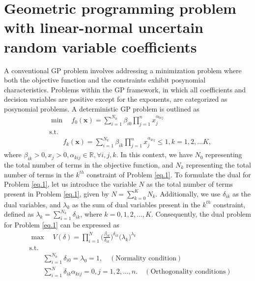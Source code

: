 \section{ Geometric programming problem with linear-normal uncertain random variable coefficients }\label{sec.4} 
	A conventional GP problem involves addressing a minimization problem where both the objective function and the constraints exhibit posynomial characteristics. Problems within the GP framework, in which all coefficients and decision variables are positive except for the exponents, are categorized as posynomial problems. A deterministic GP problem is outlined as
\begin{equation}\label{eq.1}
	\begin{aligned}
		&\min \quad f_0(\textbf{x})=\sum\limits_{i=1}^{N_0}\beta_{i0}\prod\limits_{j=1}^{n}x_j^{\alpha_{0ij}}\\
		&\text{s.t.}\\
		& \qquad f_k(\textbf{x})=\sum\limits_{i=1}^{N_k}\beta_{ik}\prod\limits_{j=1}^{n}x_j^{\alpha_{kij}}\leq 1,k=1,2,\ldots K,
	\end{aligned}
\end{equation}
where $\beta_{ik}>0, x_j>0, \alpha_{kij} \in \mathbb{R},\forall i,j,k$.
In this context, we have $N_0$ representing the total number of terms in the objective function, and $N_k$ representing the total number of terms in the $k^{th}$ constraint of Problem \ref{eq.1}. To formulate the dual for Problem \ref{eq.1}, let us introduce the variable $N$ as the total number of terms present in Problem \ref{eq.1}, given by $N=\sum\limits_{k=0}^{K}N_k$. Additionally, we use $\delta_{ik}$ as the dual variables, and $\lambda_k$ as the sum of dual variables present in the $k^{th}$ constraint, defined as $\lambda_k=\sum\limits_{i=1}^{N_k}{\delta_{ik}}$, where $k=0,1,2,\ldots,K$. Consequently, the dual problem for Problem \ref{eq.1} can be expressed as
\begin{equation}\label{eq.2}
	\begin{aligned}
		&	\max \quad V(\delta)=\prod_{i=1}^{N}\bigg(\frac{\beta_{ik}}{{\delta_{ik}}}\bigg)^{{\delta_{ik}}}\bigg(\lambda_k\bigg)^{\lambda_k}\\
		&	\text{s.t.}\\
		& \qquad \sum\limits_{i=1}^{N_0}{\delta_{i0}}=\lambda_0=1, \quad (\text{Normality condition})\\
		& \qquad\sum\limits_{i=1}^{N}{\delta_{ik}}{\alpha_{kij}}=0,j=1,2,\ldots,n. \quad (\text{Orthogonality conditions})
	\end{aligned}
\end{equation}
